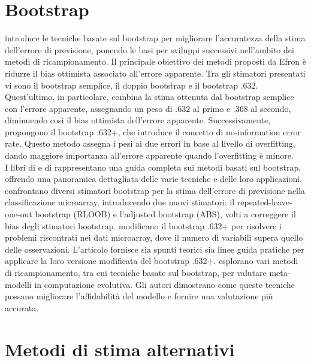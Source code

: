 \section{Bootstrap}
\label{sec:sezione7.3}


\textcite{efron1983} introduce le tecniche basate sul bootstrap per migliorare l’accuratezza della stima dell’errore di previsione, ponendo le basi per sviluppi successivi nell’ambito dei metodi di ricampionamento. Il principale obiettivo dei metodi proposti da Efron è ridurre il bias ottimista associato all’errore apparente. Tra gli stimatori presentati vi sono il bootstrap semplice, il doppio bootstrap e il bootstrap .632. Quest’ultimo, in particolare, combina la stima ottenuta dal bootstrap semplice con l’errore apparente, assegnando un peso di $.632$ al primo e $.368$ al secondo, diminuendo così il bias ottimista dell’errore apparente. Successivamente, \textcite{improvements} propongono il bootstrap .632+, che introduce il concetto di no-information error rate. Questo metodo assegna i pesi ai due errori in base al livello di overfitting, dando maggiore importanza all’errore apparente quando l’overfitting è minore.\\
I libri di \textcite{efron1993} e di \textcite{guideforpractitioners} rappresentano una guida completa sui metodi basati sul bootstrap, offrendo una panoramica dettagliata delle varie tecniche e delle loro applicazioni. \textcite{jiang2007} confrontano diversi stimatori bootstrap per la stima dell’errore di previsione nella classificazione microarray, introducendo due nuovi stimatori: il repeated-leave-one-out bootstrap (RLOOB) e l’adjusted bootstrap (ABS), volti a correggere il bias degli stimatori bootstrap. \textcite{jiang2013} modificano il bootstrap .632+ per risolvere i problemi riscontrati nei dati microarray, dove il numero di variabili supera quello delle osservazioni. L’articolo fornisce sia spunti teorici sia linee guida pratiche per applicare la loro versione modificata del bootstrap .632+. \textcite{bischl} esplorano vari metodi di ricampionamento, tra cui tecniche basate sul bootstrap, per valutare meta-modelli in computazione evolutiva. Gli autori dimostrano come queste tecniche possano migliorare l’affidabilità del modello e fornire una valutazione più accurata.


\section{Metodi di stima alternativi}
\label{sec:sezione7.4}


